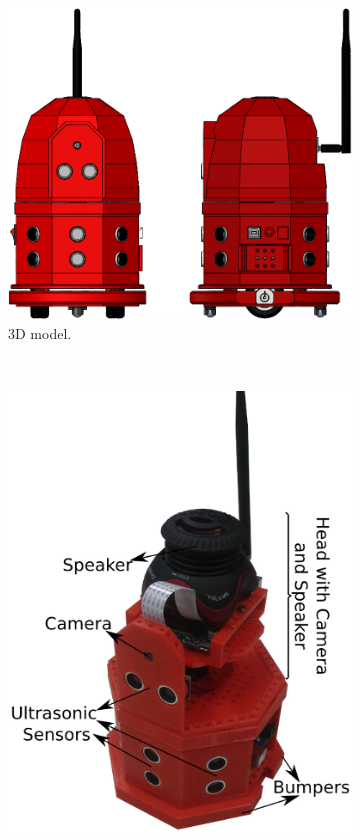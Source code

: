 \begin{figure}[h!]
    \centering
    \begin{subfigure}[b]{0.8\linewidth}
        \centering
        \includegraphics[width=\linewidth]{figs/donnie-3d_model.png}
        \caption{3D model.}
    \end{subfigure}
    ~
    \begin{subfigure}[b]{0.8\linewidth}
        \centering
        \includegraphics[width=\linewidth]{figs/donnie-printed.png}

\end{subfigure}
\end{figure}
